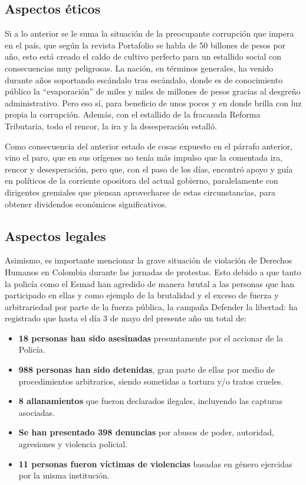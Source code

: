 \documentclass[doc, 12pt, letterpaper, donotrepeattitle, floatsintext, natbib]{apa7}
\begin{document}
\subsection{Aspectos éticos}
Si a lo anterior se le suma la situación de la preocupante corrupción que impera en el país, que según la revista Portafolio se habla de 50 billones de pesos por año, esto está creado el caldo de cultivo perfecto para un estallido social con consecuencias muy peligrosas. La nación, en términos generales, ha venido durante años soportando escándalo tras escándalo, donde es de conocimiento público la “evaporación” de miles y miles de millones de pesos gracias al desgreño administrativo. Pero eso sí, para beneficio de unos pocos y en donde brilla con luz propia la corrupción. Además, con el estallido de la fracasada Reforma Tributaria, todo el rencor, la ira y la desesperación estalló.

Como consecuencia del anterior estado de cosas expuesto en el párrafo anterior, vino el paro, que en sus orígenes no tenía más impulso que la comentada ira, rencor y desesperación, pero que, con el paso de los días, encontró apoyo y guía en políticos de la corriente opositora del actual gobierno, paralelamente con dirigentes gremiales que piensan aprovecharse de estas circunstancias, para obtener dividendos económicos significativos.

\subsection{Aspectos legales}
Asimismo, es importante mencionar la grave situación de violación de Derechos Humanos en Colombia durante las jornadas de protestas. Esto debido a que tanto la policía como el Esmad han agredido de manera brutal a las personas que han participado en ellas y como ejemplo de la brutalidad y el exceso de fuerza y arbitrariedad por parte de la fuerza pública, la campaña Defender la libertad: ha registrado que hasta el día 3 de mayo del presente año un total de:
\begin{itemize}
    \item \textbf{18 personas han sido asesinadas} presuntamente por el accionar de la Policía.
    \item \textbf{988 personas han sido detenidas}, gran parte de ellas por medio de procedimientos arbitrarios, siendo sometidas a tortura y/o tratos crueles.
    \item \textbf{8 allanamientos} que fueron declarados ilegales, incluyendo las capturas asociadas.
    \item \textbf{Se han presentado 398 denuncias} por abusos de poder, autoridad, agresiones y violencia policial.
    \item \textbf{11 personas fueron víctimas de violencias} basadas en género ejercidas por la misma institución.
\end{itemize}
\end{document}
